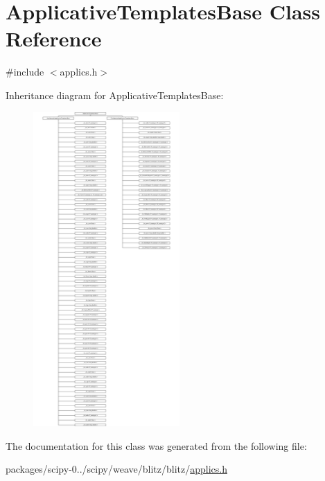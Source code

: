 \hypertarget{classApplicativeTemplatesBase}{}\section{Applicative\+Templates\+Base Class Reference}
\label{classApplicativeTemplatesBase}


{\ttfamily \#include $<$applics.\+h$>$}

Inheritance diagram for Applicative\+Templates\+Base\+:\begin{figure}[H]
\begin{center}
\leavevmode
\includegraphics[height=12.000000cm]{classApplicativeTemplatesBase}
\end{center}
\end{figure}


The documentation for this class was generated from the following file\+:\begin{DoxyCompactItemize}
\item 
packages/scipy-\/0../scipy/weave/blitz/blitz/\hyperlink{applics_8h}{applics.\+h}\end{DoxyCompactItemize}
